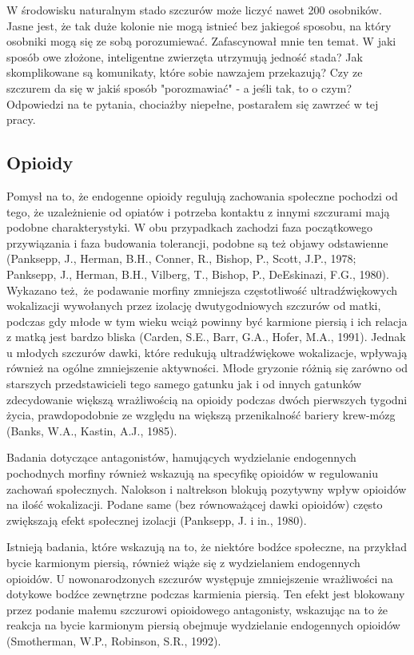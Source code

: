 \documentclass{psychol}
\begin{document}
\pagebreak

W środowisku naturalnym stado szczurów może liczyć nawet 200 osobników. Jasne jest, że tak duże kolonie nie mogą istnieć bez jakiegoś sposobu, na który osobniki mogą się ze sobą porozumiewać. Zafascynował mnie ten temat. W jaki sposób owe złożone, inteligentne zwierzęta utrzymują jedność stada? Jak skomplikowane są komunikaty, które sobie nawzajem przekazują? Czy ze szczurem da się w jakiś sposób "porozmawiać" - a jeśli tak, to o czym? Odpowiedzi na te pytania, chociażby niepełne, postarałem się zawrzeć w tej pracy.


\subsection{Opioidy}

Pomysł na to, że endogenne opioidy regulują zachowania społeczne pochodzi od tego, że uzależnienie od opiatów i potrzeba kontaktu z innymi szczurami mają podobne charakterystyki. W obu przypadkach zachodzi faza początkowego przywiązania i faza budowania tolerancji, podobne są też objawy odstawienne (Panksepp, J., Herman, B.H., Conner, R., Bishop, P., Scott, J.P., 1978; Panksepp, J., Herman, B.H., Vilberg, T., Bishop, P., DeEskinazi, F.G., 1980). Wykazano też, że podawanie morfiny zmniejsza częstotliwość ultradźwiękowych wokalizacji wywołanych przez izolację dwutygodniowych szczurów od matki, podczas gdy młode w tym wieku wciąż powinny być karmione piersią i ich relacja z matką jest bardzo bliska (Carden, S.E., Barr, G.A., Hofer, M.A., 1991).
Jednak u młodych szczurów dawki, które redukują ultradźwiękowe wokalizacje, wpływają również na ogólne zmniejszenie aktywności. Młode gryzonie różnią się zarówno od starszych przedstawicieli tego samego gatunku jak i od innych gatunków zdecydowanie większą wrażliwością na opioidy podczas dwóch pierwszych tygodni życia, prawdopodobnie ze względu na większą przenikalność bariery krew-mózg (Banks, W.A., Kastin, A.J., 1985).

Badania dotyczące antagonistów, hamujących wydzielanie endogennych pochodnych morfiny również wskazują na specyfikę opioidów w regulowaniu zachowań społecznych. Nalokson i naltrekson blokują pozytywny wpływ opioidów na ilość wokalizacji. Podane same (bez równoważącej dawki opioidów) często zwiększają efekt społecznej izolacji (Panksepp, J. i in., 1980).

Istnieją badania, które wskazują na to, że niektóre bodźce społeczne, na przykład bycie karmionym piersią, również wiąże się z wydzielaniem endogennych opioidów. U nowonarodzonych szczurów występuje zmniejszenie wrażliwości na dotykowe bodźce zewnętrzne podczas karmienia piersią. Ten efekt jest blokowany przez podanie małemu szczurowi opioidowego antagonisty, wskazując na to że reakcja na bycie karmionym piersią obejmuje wydzielanie endogennych opioidów (Smotherman, W.P., Robinson, S.R., 1992).
\end{document}
